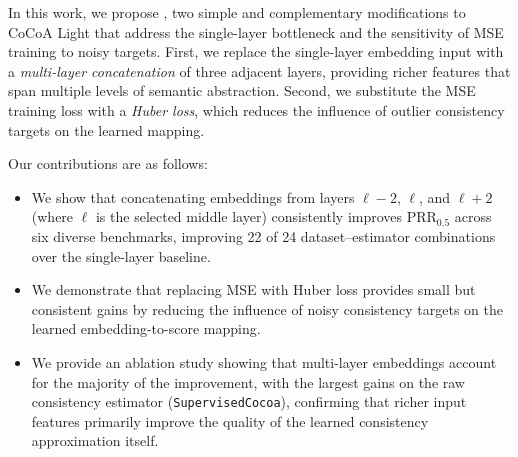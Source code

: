 In this work, we propose \method{}, two simple and complementary modifications to CoCoA Light that address the single-layer bottleneck and the sensitivity of MSE training to noisy targets.
First, we replace the single-layer embedding input with a \emph{multi-layer concatenation} of three adjacent layers, providing richer features that span multiple levels of semantic abstraction.
Second, we substitute the MSE training loss with a \emph{Huber loss}, which reduces the influence of outlier consistency targets on the learned mapping.

Our contributions are as follows:
\begin{itemize}
    \item We show that concatenating embeddings from layers $\ell{-}2$, $\ell$, and $\ell{+}2$ (where $\ell$ is the selected middle layer) consistently improves PRR$_{0.5}$ across six diverse benchmarks, improving 22 of 24 dataset--estimator combinations over the single-layer baseline.
    \item We demonstrate that replacing MSE with Huber loss provides small but consistent gains by reducing the influence of noisy consistency targets on the learned embedding-to-score mapping.
    \item We provide an ablation study showing that multi-layer embeddings account for the majority of the improvement, with the largest gains on the raw consistency estimator (\texttt{SupervisedCocoa}), confirming that richer input features primarily improve the quality of the learned consistency approximation itself.
\end{itemize}
